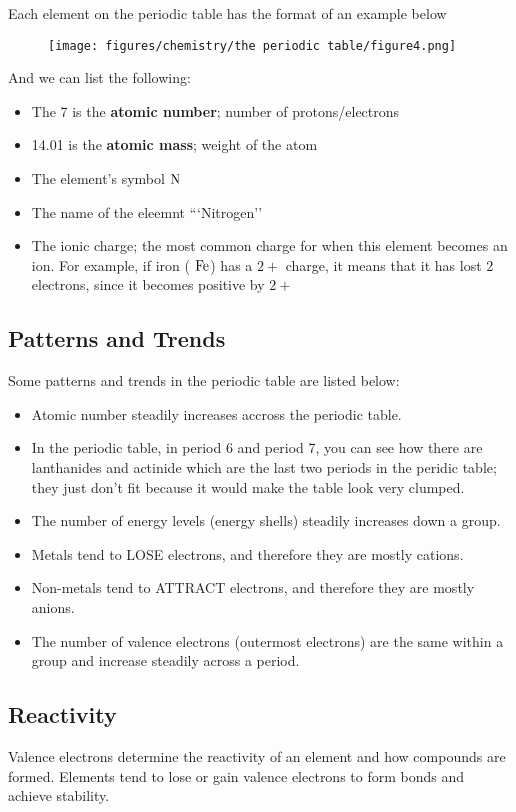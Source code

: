 \documentclass[12pt]{report}
\begin{document}
Each element on the periodic table has the format of an example below 
\begin{figure}[htb!]
\centering
\texttt{[image: figures/chemistry/the periodic table/figure4.png]}
\end{figure}

And we can list the following: 
\begin{itemize}
    \item{The 7 is the \textbf{atomic number}; number of protons/electrons}
    \item{14.01 is the \textbf{atomic mass}; weight of the atom}
    \item{The element's symbol $ \ce{N}$}
    \item{The name of the eleemnt ```Nitrogen''}
    \item{The ionic charge; the most common charge for when this element becomes an ion. For example, if iron ( $ \ce{Fe}$) has a $2+$ charge, it means that it has lost 2 electrons, since it becomes positive by $2+$}
\end{itemize}

\subsection{Patterns and Trends}
Some patterns and trends in the periodic table are listed below:
\begin{itemize}
    \item{Atomic number steadily increases accross the periodic table.}
    \item{In the periodic table, in period 6 and period 7, you can see how there are lanthanides and actinide which are the last two periods in the peridic table; they just don't fit because it would make the table look very clumped.}
    \item{The number of energy levels (energy shells) steadily increases down a group.}
    \item{Metals tend to LOSE electrons, and therefore they are mostly cations.}
    \item{Non-metals tend to ATTRACT electrons, and therefore they are mostly anions.}
    \item{The number of valence electrons (outermost electrons) are the same within a group and increase steadily across a period.}
\end{itemize}

\subsection{Reactivity}
Valence electrons determine the reactivity of an element and how compounds are formed. Elements tend to lose or gain valence electrons to form bonds and achieve stability.\\
\end{document}
